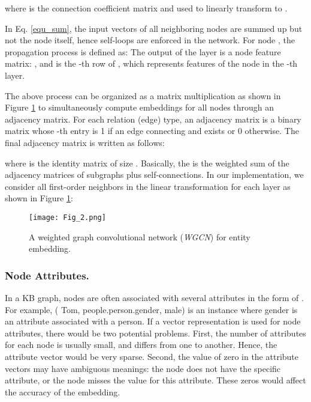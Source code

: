 \documentclass[letterpaper]{article} \usepackage{aaai19}  \usepackage{times}  \usepackage{helvet}  \usepackage{courier}  \usepackage{url}  \usepackage{graphicx}  \usepackage{amsmath}
\begin{document}
where  is the connection coefficient matrix and used to linearly transform  to .

In Eq. \eqref{equ_sum}, the input vectors of all neighboring nodes are summed up but not the node  itself, hence self-loops are enforced in the network. For node , the propagation process is defined as:
The output of the layer  is a node feature matrix: , and   is the -th row of , which represents features of the node  in the -th layer.

The above process can be organized as a matrix multiplication as shown in Figure \ref{fig:wgcn-mat} to simultaneously compute embeddings for all nodes through an adjacency matrix. For each relation (edge) type, an adjacency matrix   is a binary matrix whose -th entry is 1 if an edge connecting  and  exists or 0 otherwise. The final adjacency matrix is written as follows: 

where  is the identity matrix of size . Basically, the  is the weighted sum of the adjacency matrices of subgraphs plus self-connections. In our implementation, we consider all first-order neighbors in the linear transformation for each layer as shown in Figure \ref{fig:wgcn-mat}:


\begin{figure}
    \texttt{[image: Fig\_2.png]}
    \caption{A weighted graph convolutional network ({\it WGCN}) for entity embedding.}
    \medskip
\label{fig:wgcn-mat}
\end{figure}

\subsubsection{Node Attributes.}
In a KB graph, nodes are often associated with several attributes in the form of . For example, ( Tom,  people.person.gender,  male) is an instance where gender is an attribute associated with a person. If a vector representation is used for node attributes, there would be two potential problems. First, the number of attributes for each node is usually small, and differs from one to another. Hence, the attribute vector would be very sparse. Second, the value of zero in the attribute vectors may have ambiguous meanings: the node does not have the specific attribute, or the node misses the value for this attribute. These zeros would affect the accuracy of the embedding. 
\end{document}
